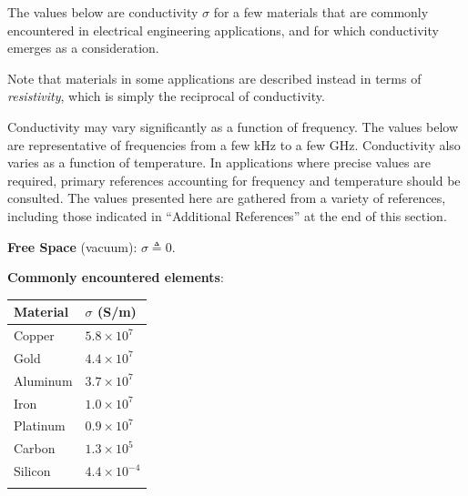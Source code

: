 

\label{m0137_Table_of_Conductivities} %

The values below are conductivity $\sigma$ for a few materials that are commonly encountered in electrical engineering applications, and for which conductivity emerges as a consideration.

Note that materials in some applications are described instead in terms of \emph{resistivity}, 
which is simply the reciprocal of conductivity.

Conductivity may vary significantly as a function of frequency.
The values below are representative of frequencies from a few kHz to a few GHz.
Conductivity also varies as a function of temperature.
In applications where precise values are required, primary references accounting for frequency and temperature should be consulted.
The values presented here are gathered from a variety of references, including those indicated in ``Additional References'' at the end of this section.
  
{\bf Free Space} (vacuum): $\sigma\triangleq 0$.

{\bf Commonly encountered elements}:\\
%
\begin{tabular}{ll}
Material                   & $\sigma$ (S/m) \\
\hline
Copper		& $5.8\times 10^7$   \\ \index{copper} %
Gold		& $4.4\times 10^7$   \\ \index{gold} %
Aluminum	& $3.7\times 10^7$   \\ \index{aluminum} %
Iron		& $1.0\times 10^7$   \\ \index{iron} %
Platinum	& $0.9\times 10^7$   \\ \index{platinum} %
Carbon		& $1.3\times 10^5$   \\ \index{carbon} %
Silicon		& $4.4\times 10^{-4}$\\ \index{silicon} %
\end{tabular}

